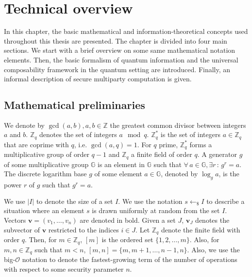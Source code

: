 


%

\chapter{Technical overview}

In this chapter, the basic mathematical and information-theoretical concepts used throughout this thesis are presented. The chapter is divided into four main sections. We start with a brief overview on some same mathematical notation elements. Then, the basic formalism of quantum information and the universal composability framework in the quantum setting are introduced. Finally, an informal description of secure multiparty computation is given.

\section{Mathematical preliminaries}

We denote by $\gcd (a,b), a,b\in\mathbb{Z}$ the greatest common divisor between integers $a$ and $b$. $\mathbb{Z}_q$ denotes the set of integers $a \mod q$. $\mathbb{Z}^*_q$ is the set of integers $a\in\mathbb{Z}_q$ that are coprime with $q$, i.e. $\gcd (a,q) = 1$. For $q$ prime, $\mathbb{Z}^*_q$ forms a multiplicative group of order $q-1$ and $\mathbb{Z}_q$ a finite field of order $q$. A generator $g$ of some multiplicative group $\mathbb{G}$ is an element in $\mathbb{G}$ such that $\forall\,a\in\mathbb{G}, \exists r\, :\, g^r = a$. The discrete logarithm base $g$ of some element $a\in\mathbb{G}$, denoted by $\log_g a$, is the power $r$ of $g$ such that $g^r = a$. 

We use $|I|$ to denote the size of a set $I$. We use the notation $s\leftarrow_{\$}I$ to describe a situation where an element $s$ is drawn uniformly at random from the set $I$. Vectors $\bm{v}= (v_1, \ldots , v_n)$  are denoted in bold. Given a set $J$, $\bm{v}_J$ denotes the subvector of $\bm{v}$ restricted to the indices $i \in J$. Let $\mathbb{Z}_q$ denote the finite field with order $q$. Then, for $m\in \mathbb{Z}_q$, $[m]$ is the ordered set $\{1, 2, \ldots, m\}$. Also, for $m, n\in \mathbb{Z}_q$ such that $m<n$, $[m, n] = \{m, m+1, \dots, n-1, n\}$. Also, we use the big-$\mathcal{O}$ notation to denote the fastest-growing term of the number of operations with respect to some security parameter $n$.

